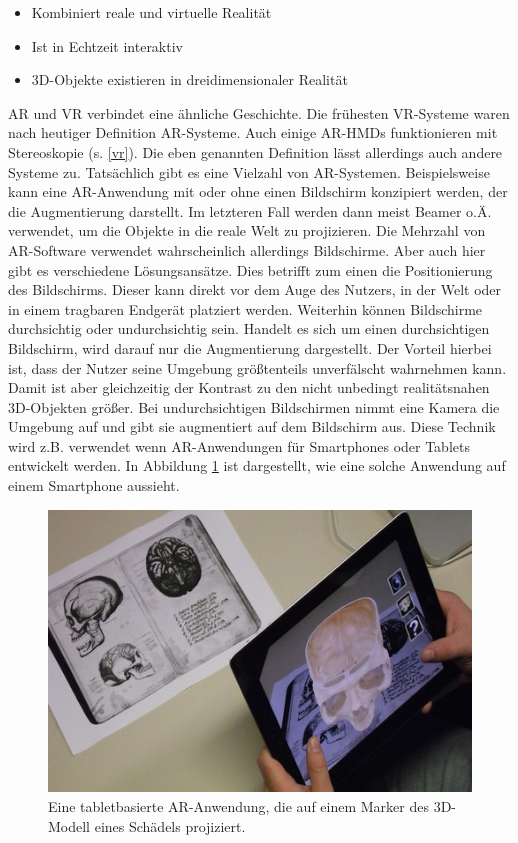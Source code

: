 \begin{itemize}
\item Kombiniert reale und virtuelle Realität
\item Ist in Echtzeit interaktiv
\item 3D-Objekte existieren in dreidimensionaler Realität
\end{itemize}

AR und VR verbindet eine ähnliche Geschichte. Die frühesten VR-Systeme waren nach heutiger Definition AR-Systeme.
Auch einige AR-HMDs funktionieren mit Stereoskopie (s. \ref{vr}). Die eben genannten Definition lässt allerdings auch andere Systeme zu. Tatsächlich gibt es eine Vielzahl von AR-Systemen. 
Beispielsweise kann eine AR-Anwendung mit oder ohne einen Bildschirm konzipiert werden, der die Augmentierung darstellt. Im letzteren Fall werden dann meist Beamer o.Ä. verwendet, um die Objekte in die reale Welt zu projizieren. 
Die Mehrzahl von AR-Software verwendet wahrscheinlich allerdings Bildschirme. %
Aber auch hier gibt es verschiedene Lösungsansätze. Dies betrifft zum einen die Positionierung des Bildschirms. Dieser kann direkt vor dem Auge des Nutzers, in der Welt oder in einem tragbaren Endgerät platziert werden.
Weiterhin können Bildschirme durchsichtig oder undurchsichtig sein. Handelt es sich um einen durchsichtigen Bildschirm, wird darauf nur die Augmentierung dargestellt. Der Vorteil hierbei ist, dass der Nutzer seine Umgebung größtenteils unverfälscht wahrnehmen kann. Damit ist aber gleichzeitig der Kontrast zu den nicht unbedingt realitätsnahen 3D-Objekten größer.
Bei undurchsichtigen Bildschirmen nimmt eine Kamera die Umgebung auf und gibt sie augmentiert auf dem Bildschirm aus. Diese Technik wird z.B. verwendet wenn AR-Anwendungen für Smartphones oder Tablets entwickelt werden. In Abbildung \ref{img:ARMarker} ist dargestellt, wie eine solche Anwendung auf einem Smartphone aussieht.

\begin{figure}
	\centering
	\includegraphics[width=0.5\linewidth]{images/App_iSkull,_an_augmented_human_skull.jpg}
	\caption{Eine tabletbasierte AR-Anwendung, die auf einem Marker des 3D-Modell  eines Schädels projiziert.}
	\label{img:ARMarker}
\end{figure}

